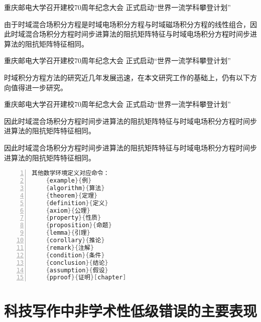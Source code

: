 \documentclass{cqupt_thesis}
\begin{document}
    重庆邮电大学召开建校70周年纪念大会 正式启动“世界一流学科攀登计划”

    \begin{pproof}
        由于时域混合场积分方程是时域电场积分方程与时域磁场积分方程的线性组合，因此时域混合场积分方程时间步进算法的阻抗矩阵特征与时域电场积分方程时间步进算法的阻抗矩阵特征相同。
    \end{pproof}

    重庆邮电大学召开建校70周年纪念大会 正式启动“世界一流学科攀登计划”

    \begin{corollary}
        时域积分方程方法的研究近几年发展迅速，在本文研究工作的基础上，仍有以下方向值得进一步研究。
    \end{corollary}

    重庆邮电大学召开建校70周年纪念大会 正式启动“世界一流学科攀登计划”

    \begin{lemma}[芜湖]
        因此时域混合场积分方程时间步进算法的阻抗矩阵特征与时域电场积分方程时间步进算法的阻抗矩阵特征相同。
    \end{lemma}

    \begin{lemma}
        因此时域混合场积分方程时间步进算法的阻抗矩阵特征与时域电场积分方程时间步进算法的阻抗矩阵特征相同。
    \end{lemma}

    \begin{lstlisting}[language = c, numbers=left,
    numberstyle=\tiny,keywordstyle=\color{blue!70},
    commentstyle=\color{red!50!green!50!blue!50},frame=shadowbox,
    rulesepcolor=\color{red!20!green!20!blue!20},basicstyle=\ttfamily]
	其他数学环境定义对应命令：
	{example}{例}           
	{algorithm}{算法}
	{theorem}{定理}
	{definition}{定义}
	{axiom}{公理}
	{property}{性质}
	{proposition}{命题}
	{lemma}{引理}
	{corollary}{推论}
	{remark}{注解}
	{condition}{条件}
	{conclusion}{结论}
	{assumption}{假设}
	{pproof}{证明}[chapter]

    \end{lstlisting}



    \begin{reference}
        
    \end{reference}


    \beginappendix
    \chapter{科技写作中非学术性低级错误的主要表现}
\end{document}
